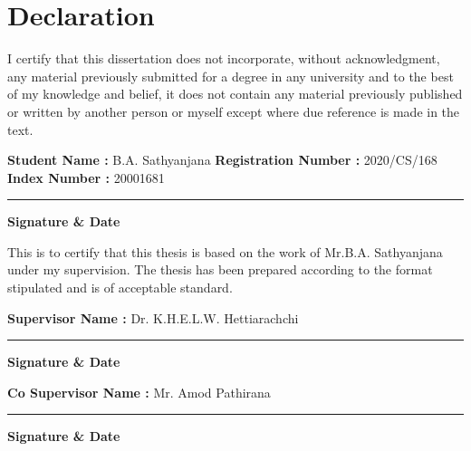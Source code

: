 \newpage
\section*{Declaration}
I certify that this dissertation does not incorporate, without acknowledgment, any material previously submitted for a degree in any university and to the best of my knowledge and belief, it does not contain any material previously published or written by another person or myself except where due reference is made in the text. 

\vspace{.5cm}
\noindent
\textbf{Student Name :} B.A. Sathyanjana
\newline
\textbf{Registration Number :} 2020/CS/168
\newline
\textbf{Index Number :} 20001681
\vspace{2cm}
\newline
\rule{5cm}{0.15mm}
\newline
\textbf{Signature \& Date}

\vspace{.5cm}
\noindent
This is to certify that this thesis is based on the work of Mr.B.A. Sathyanjana under my supervision. The thesis has been prepared according to the format stipulated and is of acceptable standard.

\vspace{.8cm}
\noindent
\textbf{Supervisor Name :} Dr. K.H.E.L.W. Hettiarachchi
\vspace{2cm}
\newline
\rule{5cm}{0.15mm}
\newline
\textbf{Signature \& Date}

\vspace{1cm}
\noindent
\textbf{Co Supervisor Name :} Mr. Amod Pathirana
\vspace{2cm}
\newline
\rule{5cm}{0.15mm}
\newline
\textbf{Signature \& Date}
